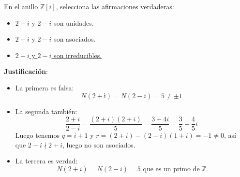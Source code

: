 \begin{ejercicio}
    En el anillo $\mathbb{Z}[i]$, selecciona las afirmaciones verdaderas:
    \begin{itemize}
        \item $2+ i$ y $2-i$ son unidades.
        \item $2+i$ y $2-i$ son asociados.
        \item \underline{$2+i$ y $2-i$ son irreducibles.}
    \end{itemize}

    \noindent
    \textbf{Justificación}:
    \begin{itemize}
        \item La primera es falsa:
            \begin{equation*}
                N(2+ì) = N(2-i) = 5 \neq \pm 1
            \end{equation*}
        \item La segunda también:
            \begin{equation*}
                \dfrac{2+i}{2-i} = \dfrac{(2+i)(2+i)}{5} = \dfrac{3+4i}{5} = \dfrac{3}{5}+\dfrac{4}{5}i
            \end{equation*}
            Luego tenemos $q=i+1$ y $r=(2+i)-(2-i)(1+i)=-1\neq 0$, así que $2-i\nmid 2+i$, luego no son asociados.
        \item La tercera es verdad:
            \begin{equation*}
                N(2+i) = N(2-i) = 5 \text{\ que\ es\ un\ primo\ de\ } \mathbb{Z}
            \end{equation*}
    \end{itemize}
\end{ejercicio}

